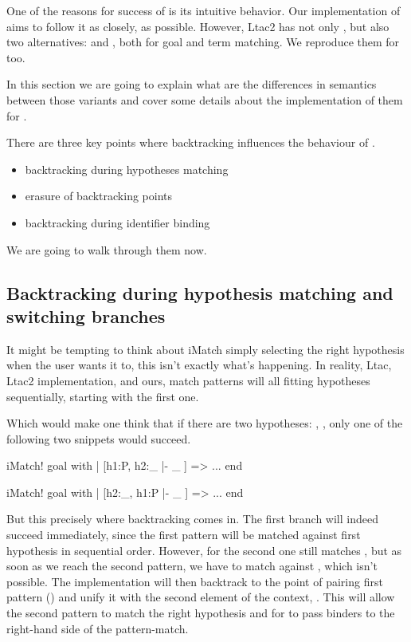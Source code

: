One of the reasons for success of  is its intuitive behavior.
Our implementation of  aims to follow it as closely, as possible.
However, Ltac2 has not only , but also two alternatives:  and , both for goal and term matching.
We reproduce them for  too.

In this section we are going to explain what are the differences in semantics between those variants and cover some details about the implementation of them for .

There are three key points where backtracking influences the behaviour of .
\begin{itemize}
\item backtracking during hypotheses matching
\item erasure of backtracking points
\item backtracking during identifier binding
\end{itemize}
We are going to walk through them now.

\subsection{Backtracking during hypothesis matching and switching branches}

It might be tempting to think about iMatch simply selecting the right hypothesis when the user wants it to, this isn't exactly what's happening.
In reality, Ltac, Ltac2 implementation, and ours, match patterns will all fitting hypotheses sequentially, starting with the first one.

Which would make one think that if there are two hypotheses: , , only one of the following two snippets would succeed.
\begin{coq}
  iMatch! goal with
  | [h1:P, h2:_ |- _ ] => ...
  end
\end{coq}
\begin{coq}
  iMatch! goal with
  | [h2:_, h1:P |- _ ] => ...
  end
\end{coq}

But this precisely where backtracking comes in.
The first branch will indeed succeed immediately, since the first pattern will be matched against first hypothesis in sequential order.
However, for the second one  still matches \coqe{_}, but as soon as we reach the second pattern, we have to match  against , which isn't possible.
The implementation will then backtrack to the point of pairing first pattern (\coqe{_}) and unify it with the second element of the context, .
This will allow the second pattern to match the right hypothesis and for  to pass binders to the right-hand side of the pattern-match.

